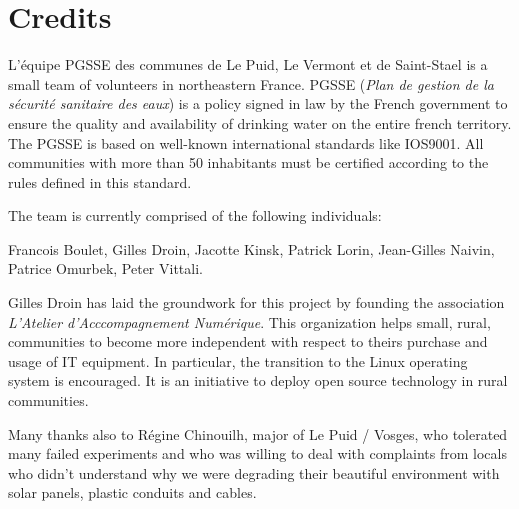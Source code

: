 \chapter*{Credits}


L’équipe PGSSE des communes de Le Puid, Le Vermont et de Saint-Stael is a small team of volunteers in northeastern France.
PGSSE (\textit{Plan de gestion de la sécurité sanitaire des eaux}) is a policy signed in law by the French government
to ensure the quality and availability of drinking water on the entire french territory. The PGSSE is based on
well-known international standards like IOS9001. All communities with more than 50 inhabitants must be certified according
to the rules defined in this standard.

The team is currently comprised of the following individuals:

Francois Boulet, Gilles Droin, Jacotte Kinsk,  Patrick Lorin, Jean-Gilles Naivin, Patrice Omurbek, Peter Vittali.



Gilles Droin has laid the groundwork for this project by founding the
association \textit{L'Atelier d'Acccompagnement Numérique}. This organization helps
small, rural, communities to become more independent with respect to theirs purchase and usage of
IT equipment. In particular, the transition to the Linux operating system is encouraged. It is an initiative
to deploy open source technology in rural communities.


Many thanks also to Régine Chinouilh, major of Le Puid / Vosges, who tolerated many failed
experiments and who was willing to deal with complaints from locals who didn't understand
why we were degrading their beautiful environment with solar panels, plastic conduits and cables.
